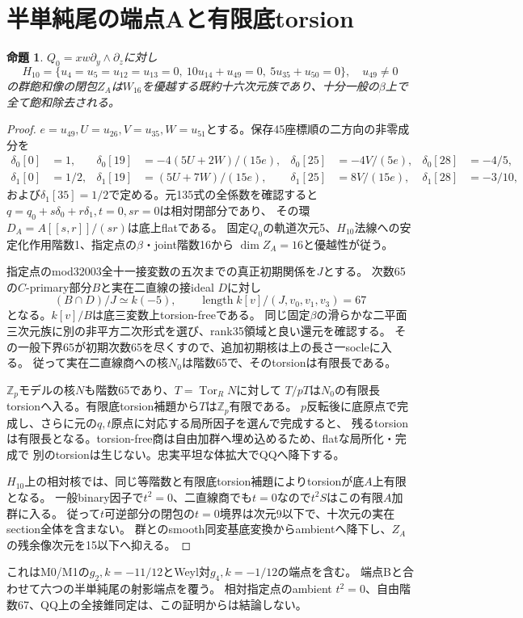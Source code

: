 \documentclass[11pt,a4paper]{ltjsarticle}
\newtheorem{proposition}[theorem]{命題}
\theoremstyle{remark}
\begin{document}
\section{半単純尾の端点Aと有限底torsion}
\begin{proposition}
$Q_0=xw\partial_y\wedge\partial_z$に対し
\[
 H_{10}=\{u_4=u_5=u_{12}=u_{13}=0,\ 10u_{14}+u_{49}=0,\ 5u_{35}+u_{50}=0\},\quad u_{49}\ne0
\]
の群飽和像の閉包$Z_A$は$W_{16}$を優越する既約十六次元族であり、十分一般の$\beta$上で全て飽和除去される。
\end{proposition}
\begin{proof}
$e=u_{49},U=u_{26},V=u_{35},W=u_{51}$とする。保存45座標順の二方向の非零成分を
\begin{align*}
 \delta_0[0]&=1,&\delta_0[19]&=-4(5U+2W)/(15e),&\delta_0[25]&=-4V/(5e),&\delta_0[28]&=-4/5,\\
 \delta_1[0]&=1/2,&\delta_1[19]&=(5U+7W)/(15e),&\delta_1[25]&=8V/(15e),&\delta_1[28]&=-3/10,
\end{align*}
および$\delta_1[35]=1/2$で定める。元135式の全係数を確認すると
$q=q_0+s\delta_0+r\delta_1,t=0,sr=0$は相対閉部分であり、
その環$D_A=A[[s,r]]/(sr)$は底上flatである。
固定$Q_0$の軌道次元5、$H_{10}$法線への安定化作用階数1、指定点の$\beta$・joint階数16から
$\dim Z_A=16$と優越性が従う。

指定点のmod32003全十一接変数の五次までの真正初期関係を$J$とする。
次数65の$C$-primary部分$B$と実在二直線の接ideal $D$に対し
\[
 (B\cap D)/J\simeq k(-5),\qquad
 \operatorname{length} k[v]/(J,v_0,v_1,v_3)=67
\]
となる。$k[v]/B$は底三変数上torsion-freeである。
同じ固定$\beta$の滑らかな二平面三次元族に別の非平方二次形式を選び、rank35領域と良い還元を確認する。
その一般下界65が初期次数65を尽くすので、追加初期核は上の長さ一socleに入る。
従って実在二直線商への核$N_0$は階数65で、そのtorsionは有限長である。

$\mathbb Z_p$モデルの核$N$も階数65であり、$T=\operatorname{Tor}_R N$に対して
$T/pT$は$N_0$の有限長torsionへ入る。有限底torsion補題から$T$は$\mathbb Z_p$有限である。
$p$反転後に底原点で完成し、さらに元の$q,t$原点に対応する局所因子を選んで完成すると、
残るtorsionは有限長となる。torsion-free商は自由加群へ埋め込めるため、flatな局所化・完成で
別のtorsionは生じない。忠実平坦な体拡大でQQへ降下する。

$H_{10}$上の相対核では、同じ等階数と有限底torsion補題によりtorsionが底$A$上有限となる。
一般binary因子で$t^2=0$、二直線商でも$t=0$なので$t^2S$はこの有限$A$加群に入る。
従って$t$可逆部分の閉包の$t=0$境界は次元9以下で、十次元の実在section全体を含まない。
群とのsmooth同変基底変換からambientへ降下し、$Z_A$の残余像次元を15以下へ抑える\cite{semi-a-v44}。
\end{proof}
これはM0/M1の$g_2,k=-11/12$とWeyl対$g_4,k=-1/12$の端点を含む。
端点Bと合わせて六つの半単純尾の射影端点を覆う。
相対指定点のambient $t^2=0$、自由階数67、QQ上の全接錐同定は、この証明からは結論しない。
\end{document}

